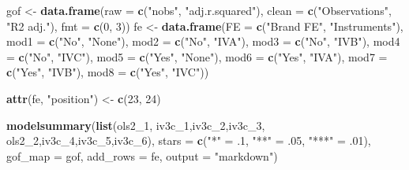 \documentclass[
]{article}
\newenvironment{Shaded}{\begin{snugshade}}{\end{snugshade}}
\newcommand{\AttributeTok}[1]{\textcolor[rgb]{0.13,0.29,0.53}{#1}}
\newcommand{\DecValTok}[1]{\textcolor[rgb]{0.00,0.00,0.81}{#1}}
\newcommand{\FunctionTok}[1]{\textcolor[rgb]{0.13,0.29,0.53}{\textbf{#1}}}
\newcommand{\NormalTok}[1]{#1}
\newcommand{\OtherTok}[1]{\textcolor[rgb]{0.56,0.35,0.01}{#1}}
\newcommand{\StringTok}[1]{\textcolor[rgb]{0.31,0.60,0.02}{#1}}
\begin{document}
\begin{Shaded}
\begin{Highlighting}[]
\NormalTok{gof }\OtherTok{\textless{}{-}} \FunctionTok{data.frame}\NormalTok{(}\AttributeTok{raw =} \FunctionTok{c}\NormalTok{(}\StringTok{"nobs"}\NormalTok{, }\StringTok{"adj.r.squared"}\NormalTok{),}
                  \AttributeTok{clean =} \FunctionTok{c}\NormalTok{(}\StringTok{"Observations"}\NormalTok{, }\StringTok{"R2 adj."}\NormalTok{),}
                  \AttributeTok{fmt =} \FunctionTok{c}\NormalTok{(}\DecValTok{0}\NormalTok{, }\DecValTok{3}\NormalTok{))}
\NormalTok{fe }\OtherTok{\textless{}{-}} \FunctionTok{data.frame}\NormalTok{(}\AttributeTok{FE =} \FunctionTok{c}\NormalTok{(}\StringTok{"Brand FE"}\NormalTok{, }\StringTok{"Instruments"}\NormalTok{),}
                 \AttributeTok{mod1 =} \FunctionTok{c}\NormalTok{(}\StringTok{"No"}\NormalTok{, }\StringTok{"None"}\NormalTok{),}
                 \AttributeTok{mod2 =} \FunctionTok{c}\NormalTok{(}\StringTok{"No"}\NormalTok{, }\StringTok{"IVA"}\NormalTok{),}
                 \AttributeTok{mod3 =} \FunctionTok{c}\NormalTok{(}\StringTok{"No"}\NormalTok{, }\StringTok{"IVB"}\NormalTok{),}
                 \AttributeTok{mod4 =} \FunctionTok{c}\NormalTok{(}\StringTok{"No"}\NormalTok{, }\StringTok{"IVC"}\NormalTok{),}
                \AttributeTok{mod5 =} \FunctionTok{c}\NormalTok{(}\StringTok{"Yes"}\NormalTok{, }\StringTok{"None"}\NormalTok{),}
                \AttributeTok{mod6 =} \FunctionTok{c}\NormalTok{(}\StringTok{"Yes"}\NormalTok{, }\StringTok{"IVA"}\NormalTok{),}
                \AttributeTok{mod7 =} \FunctionTok{c}\NormalTok{(}\StringTok{"Yes"}\NormalTok{, }\StringTok{"IVB"}\NormalTok{),}
                \AttributeTok{mod8 =} \FunctionTok{c}\NormalTok{(}\StringTok{"Yes"}\NormalTok{, }\StringTok{"IVC"}\NormalTok{))}

\FunctionTok{attr}\NormalTok{(fe, }\StringTok{"position"}\NormalTok{) }\OtherTok{\textless{}{-}} \FunctionTok{c}\NormalTok{(}\DecValTok{23}\NormalTok{, }\DecValTok{24}\NormalTok{)}

\FunctionTok{modelsummary}\NormalTok{(}\FunctionTok{list}\NormalTok{(ols2\_1, iv3c\_1,iv3c\_2,iv3c\_3, ols2\_2,iv3c\_4,iv3c\_5,iv3c\_6),}
              \AttributeTok{stars =} \FunctionTok{c}\NormalTok{(}\StringTok{"*"} \OtherTok{=}\NormalTok{ .}\DecValTok{1}\NormalTok{, }\StringTok{"**"} \OtherTok{=}\NormalTok{ .}\DecValTok{05}\NormalTok{, }\StringTok{"***"} \OtherTok{=}\NormalTok{ .}\DecValTok{01}\NormalTok{),}
              \AttributeTok{gof\_map =}\NormalTok{ gof, }\AttributeTok{add\_rows =}\NormalTok{ fe, }\AttributeTok{output =} \StringTok{"markdown"}\NormalTok{)}
\end{Highlighting}
\end{Shaded}
\end{document}
